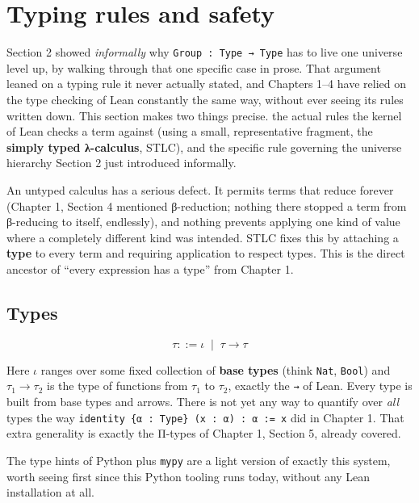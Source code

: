 \section{Typing rules and safety}\label{sec:05-rigor-check:03-typing-rules-and-safety:1}

Section 2 showed \emph{informally} why \texttt{Group : Type → Type} has to live one universe level up, by walking through that one specific case in prose. That argument leaned on a typing rule it never actually stated, and Chapters 1--4 have relied on the type checking of Lean constantly the same way, without ever seeing its rules written down. This section makes two things precise. the actual rules the kernel of Lean checks a term against (using a small, representative fragment, the \textbf{simply typed λ-calculus}, STLC), and the specific rule governing the universe hierarchy Section 2 just introduced informally.

An untyped calculus has a serious defect. It permits terms that reduce forever (Chapter 1, Section 4 mentioned β-reduction; nothing there stopped a term from β-reducing to itself, endlessly), and nothing prevents applying one kind of value where a completely different kind was intended. STLC fixes this by attaching a \textbf{type} to every term and requiring application to respect types. This is the direct ancestor of ``every expression has a type'' from Chapter 1.

\subsection{Types}\label{sec:05-rigor-check:03-typing-rules-and-safety:2}

\[
\tau ::= \iota \;\mid\; \tau \to \tau
\]

Here \(\iota\) ranges over some fixed collection of \textbf{base types} (think \texttt{Nat}, \texttt{Bool}) and \(\tau_1 \to \tau_2\) is the type of functions from \(\tau_1\) to \(\tau_2\), exactly the \texttt{→} of Lean. Every type is built from base types and arrows. There is not yet any way to quantify over \emph{all} types the way \texttt{identity \{α : Type\} (x : α) : α := x} did in Chapter 1. That extra generality is exactly the Π-types of Chapter 1, Section 5, already covered.

\begin{progcorner}

The type hints of Python plus \texttt{mypy} are a light version of exactly this system, worth seeing first since this Python tooling runs today, without any Lean installation at all.

\end{progcorner}

